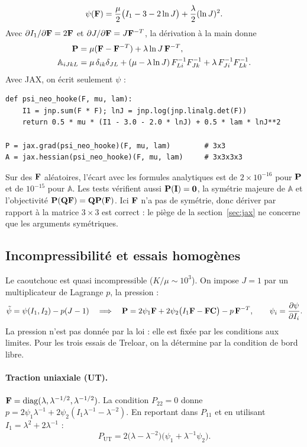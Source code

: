 \begin{equation}
\psi(\mathbf{F}) = \frac\mu2\big(I_1-3-2\ln J\big)+\frac\lambda2(\ln J)^2.
\end{equation}
Avec $\partial I_1/\partial\mathbf{F}=2\mathbf{F}$ et $\partial J/\partial\mathbf{F}=J\mathbf{F}^{-T}$, la dérivation à la main donne
\begin{align}
\mathbf{P} &= \mu(\mathbf{F}-\mathbf{F}^{-T})+\lambda\ln J\,\mathbf{F}^{-T},\\
\mathbb{A}_{iJkL} &= \mu\,\delta_{ik}\delta_{JL} + (\mu-\lambda\ln J)\,F^{-1}_{Li}F^{-1}_{Jk} + \lambda\,F^{-1}_{Ji}F^{-1}_{Lk}.
\end{align}
Avec JAX, on écrit seulement $\psi$ :
\begin{lstlisting}
def psi_neo_hooke(F, mu, lam):
    I1 = jnp.sum(F * F); lnJ = jnp.log(jnp.linalg.det(F))
    return 0.5 * mu * (I1 - 3.0 - 2.0 * lnJ) + 0.5 * lam * lnJ**2

P = jax.grad(psi_neo_hooke)(F, mu, lam)        # 3x3
A = jax.hessian(psi_neo_hooke)(F, mu, lam)     # 3x3x3x3
\end{lstlisting}
Sur des $\mathbf{F}$ aléatoires, l'écart avec les formules analytiques est de $2\times10^{-16}$ pour $\mathbf{P}$ et de $10^{-15}$ pour $\mathbb{A}$. Les tests vérifient aussi $\mathbf{P}(\mathbf{I})=\mathbf{0}$, la symétrie majeure de $\mathbb{A}$ et l'objectivité $\mathbf{P}(\mathbf{Q}\mathbf{F})=\mathbf{Q}\mathbf{P}(\mathbf{F})$. Ici $\mathbf{F}$ n'a pas de symétrie, donc dériver par rapport à la matrice $3\times3$ est correct : le piège de la section~\ref{sec:jax} ne concerne que les arguments symétriques.

\subsection{Incompressibilité et essais homogènes}

Le caoutchouc est quasi incompressible ($K/\mu\sim10^3$). On impose $J=1$ par un multiplicateur de Lagrange $p$, la pression :
\[
\tilde\psi = \psi(I_1,I_2)-p(J-1)\quad\Longrightarrow\quad \mathbf{P} = 2\psi_1\mathbf{F} + 2\psi_2\big(I_1\mathbf{F}-\mathbf{F}\mathbf{C}\big) - p\,\mathbf{F}^{-T},\qquad \psi_i=\frac{\partial\psi}{\partial I_i}.
\]
La pression n'est pas donnée par la loi : elle est fixée par les conditions aux limites. Pour les trois essais de Treloar, on la détermine par la condition de bord libre.

\paragraph{Traction uniaxiale (UT).} $\mathbf{F}=\mathrm{diag}(\lambda,\lambda^{-1/2},\lambda^{-1/2})$. La condition $P_{22}=0$ donne $p=2\psi_1\lambda^{-1}+2\psi_2(I_1\lambda^{-1}-\lambda^{-2})$. En reportant dans $P_{11}$ et en utilisant $I_1=\lambda^2+2\lambda^{-1}$ :
\begin{equation}
P_{\mathrm{UT}} = 2\big(\lambda-\lambda^{-2}\big)\big(\psi_1+\lambda^{-1}\psi_2\big).
\end{equation}
